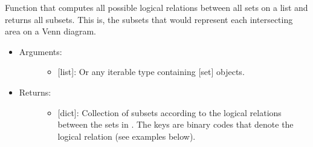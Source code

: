\documentclass[letterpaper,10pt,english]{sphinxmanual}
\begin{document}
\begin{fulllineitems}
\label{\detokenize{sets:data_tools.sets.subsets}}
Function that computes all possible logical relations between all
sets on a list  and returns all subsets. This is, the subsets
that would represent each intersecting area on a Venn diagram.
\begin{itemize}
\item {} \begin{description}
\item[{Arguments:}] \leavevmode\begin{itemize}
\item {} 
 {[}list{]}: Or any iterable type containing {[}set{]} objects.

\end{itemize}

\end{description}

\item {} \begin{description}
\item[{Returns:}] \leavevmode\begin{itemize}
\item {} 
{[}dict{]}: Collection of subsets according to the logical
relations between the sets in . The keys are binary codes
that denote the logical relation (see examples below).

\end{itemize}

\end{description}


\end{itemize}
\end{fulllineitems}
\end{document}
